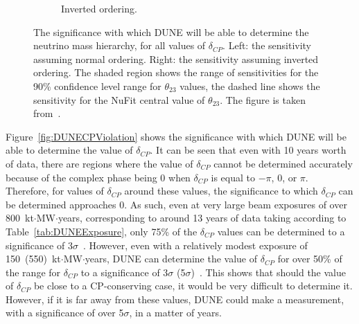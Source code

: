 \begin{figure}
\begin{subfigure}{0.49\textwidth}
    \caption{Inverted ordering.}
  \end{subfigure}
  \caption[The significance with which DUNE will be able to determine the neutrino mass hierarchy, for all values of $\delta_{CP}$]
          {The significance with which DUNE will be able to determine the neutrino mass hierarchy, for all values of $\delta_{CP}$. Left: the sensitivity assuming normal ordering. Right: the sensitivity assuming inverted ordering. The shaded region shows the range of sensitivities for the 90\% confidence level range for $\theta_{23}$ values, the dashed line shows the sensitivity for the NuFit central value of $\theta_{23}$. The figure is taken from~\citep{DUNE2335}.}
  \label{fig:DUNEMassHierarchy}
\end{figure}

Figure~\ref{fig:DUNECPViolation} shows the significance with which DUNE will be able to determine the value of $\delta_{CP}$. It can be seen that even with 10 years worth of data, there are regions where the value of $\delta_{CP}$ cannot be determined accurately because of the complex phase being 0 when $\delta_{CP}$ is equal to $-\pi$, 0, or $\pi$. Therefore, for values of $\delta_{CP}$ around these values, the significance to which $\delta_{CP}$ can be determined approaches 0. As such, even at very large beam exposures of over 800~kt$\cdot$MW$\cdot$years, corresponding to around 13 years of data taking according to Table~\ref{tab:DUNEExposure}, only 75\% of the $\delta_{CP}$ values can be determined to a significance of 3$\sigma$~\citep{DUNE2401}. However, even with a relatively modest exposure of 150~(550)~kt$\cdot$MW$\cdot$years, DUNE can determine the value of $\delta_{CP}$ for over 50\% of the range for $\delta_{CP}$ to a significance of 3$\sigma$ (5$\sigma$)~\citep{DUNE2401}. This shows that should the value of $\delta_{CP}$ be close to a CP-conserving case, it would be very difficult to determine it. However, if it is far away from these values, DUNE could make a measurement, with a significance of over 5$\sigma$, in a matter of years. \\

